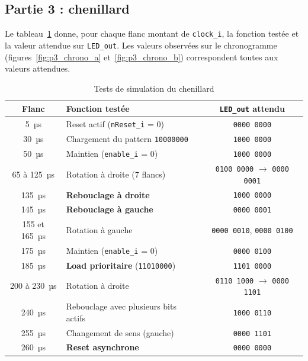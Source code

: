 \subsection{Partie 3 : chenillard}

Le tableau~\ref{tab:p3_tests} donne, pour chaque flanc montant de
\texttt{clock\_i}, la fonction testée et la valeur attendue sur \texttt{LED\_out}.
Les valeurs observées sur le chronogramme (figures~\ref{fig:p3_chrono_a} et~\ref{fig:p3_chrono_b})
correspondent toutes aux valeurs attendues.

\begin{table}[H]
  \centering
  \small
  \begin{tabular}{c l c}
    \hline
    \textbf{Flanc} & \textbf{Fonction testée} & \textbf{\texttt{LED\_out} attendu} \\
    \hline
    5~µs   & Reset actif (\texttt{nReset\_i} = 0)               & \texttt{0000 0000} \\
    30~µs  & Chargement du pattern \texttt{10000000}            & \texttt{1000 0000} \\
    50~µs  & Maintien (\texttt{enable\_i} = 0)                  & \texttt{1000 0000} \\
    65 à 125~µs      & Rotation à droite (7 flancs)                       & \texttt{0100 0000} $\rightarrow$ \texttt{0000 0001} \\
    135~µs & \textbf{Rebouclage à droite} & \texttt{1000 0000} \\
    145~µs & \textbf{Rebouclage à gauche} & \texttt{0000 0001} \\
    155 et 165~µs     & Rotation à gauche                                  & \texttt{0000 0010}, \texttt{0000 0100} \\
    175~µs & Maintien (\texttt{enable\_i} = 0)                  & \texttt{0000 0100} \\
    185~µs & \textbf{Load prioritaire} (\texttt{11010000}) & \texttt{1101 0000} \\
    200 à 230~µs     & Rotation à droite            & \texttt{0110 1000} $\rightarrow$ \texttt{0000 1101} \\
    240~µs & Rebouclage avec plusieurs bits actifs              & \texttt{1000 0110} \\
    255~µs & Changement de sens (gauche)                        & \texttt{0000 1101} \\
    260~µs & \textbf{Reset asynchrone}      & \texttt{0000 0000} \\
    \hline
  \end{tabular}
  \caption{Tests de simulation du chenillard}
  \label{tab:p3_tests}
\end{table}


